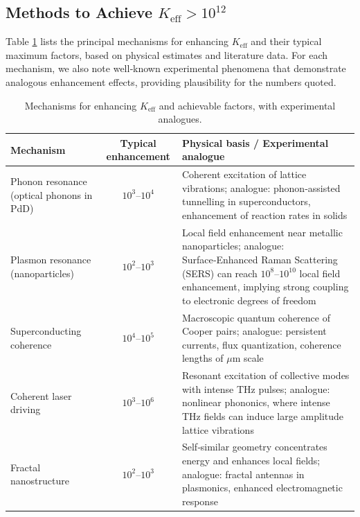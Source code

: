 \documentclass[12pt]{article}
\theoremstyle{remark}
\newcommand{\Keff}{K_{\mathrm{eff}}}
\begin{document}
	\subsection{Methods to Achieve \(\Keff > 10^{12}\)}
	
	Table \ref{tab:enhancement} lists the principal mechanisms for enhancing \(\Keff\) and their typical maximum factors, based on physical estimates and literature data. For each mechanism, we also note well‑known experimental phenomena that demonstrate analogous enhancement effects, providing plausibility for the numbers quoted.
	
	\begin{table}[htbp]
		\centering
		\caption{Mechanisms for enhancing \(\Keff\) and achievable factors, with experimental analogues.}
		\label{tab:enhancement}
		\small
		\begin{tabularx}{\textwidth}{>{\raggedright\arraybackslash}p{3.2cm} c X}
			\toprule
			\textbf{Mechanism} & \textbf{Typical enhancement} & \textbf{Physical basis / Experimental analogue} \\
			\midrule
			Phonon resonance (optical phonons in PdD) & \(10^3\)–\(10^4\) & Coherent excitation of lattice vibrations; analogue: phonon‑assisted tunnelling in superconductors, enhancement of reaction rates in solids \cite{Storms2014, Tinkham2004} \\
			Plasmon resonance (nanoparticles) & \(10^2\)–\(10^3\) & Local field enhancement near metallic nanoparticles; analogue: Surface‑Enhanced Raman Scattering (SERS) can reach \(10^8\)–\(10^{10}\) local field enhancement, implying strong coupling to electronic degrees of freedom \cite{Maier2007, SERS} \\
			Superconducting coherence & \(10^4\)–\(10^5\) & Macroscopic quantum coherence of Cooper pairs; analogue: persistent currents, flux quantization, coherence lengths of \(\mu\)m scale \cite{Tinkham2004} \\
			Coherent laser driving & \(10^3\)–\(10^6\) & Resonant excitation of collective modes with intense THz pulses; analogue: nonlinear phononics, where intense THz fields can induce large amplitude lattice vibrations \cite{Kampfrath2011} \\
			Fractal nanostructure & \(10^2\)–\(10^3\) & Self‑similar geometry concentrates energy and enhances local fields; analogue: fractal antennas in plasmonics, enhanced electromagnetic response \cite{Mandelbrot1982, fractal-antenna} \\
			\bottomrule
		\end{tabularx}
	\end{table}
	
\end{document}
